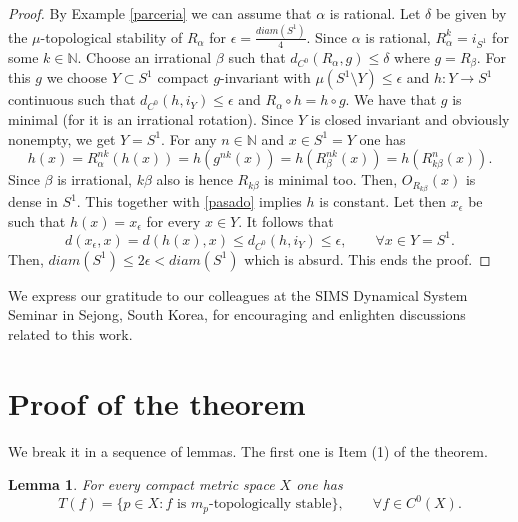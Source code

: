 \documentclass[11pt,letterpaper]{amsart}
\theoremstyle{plain}
\newtheorem{lemma}{Lemma}
\begin{document}
\begin{proof}
By Example \ref{parceria} we can assume that $\alpha$ is rational.
Let $\delta$ be given by the $\mu$-topological stability of $R_\alpha$ for $\epsilon=\frac{diam(S^1)}4$.
Since $\alpha$ is rational, $R^k_\alpha=i_{S^1}$ for some $k\in \mathbb{N}$.
Choose an irrational $\beta$ such that
$d_{C^0}(R_\alpha,g)\leq\delta$ where $g=R_\beta$.
For this $g$ we choose $Y\subset S^1$ compact $g$-invariant with $\mu(S^1\setminus Y)\leq\epsilon$ and $h:Y\to S^1$ continuous such that
$d_{C^0}(h,i_Y)\leq\epsilon$ and $R_\alpha\circ h=h\circ g$.
We have that $g$ is minimal (for it is an irrational rotation).
Since $Y$ is closed invariant and obviously nonempty, we get $Y=S^1$.
For any $n\in\mathbb{N}$ and $x\in S^1=Y$ one has
\begin{equation}
\label{pasado}
h(x)=R^{nk}_\alpha(h(x))=h(g^{nk}(x))=h(R^{nk}_\beta(x))=h(R^n_{k\beta}(x)).
\end{equation}
Since $\beta$ is irrational, $k\beta$ also is hence $R_{k\beta}$ is minimal too.
Then, $O_{R_{k\beta}}(x)$ is dense in $S^1$. This together with \eqref{pasado}
implies $h$ is constant. Let then $x_\epsilon$ be such that $h(x)=x_\epsilon$ for every $x\in Y$.
It follows that
$$
d(x_\epsilon,x)=d(h(x),x)\leq d_{C^0}(h,i_Y)\leq\epsilon,\quad\quad\forall x\in Y=S^1.
$$
Then,
$diam(S^1)\leq 2\epsilon<diam(S^1)$ which is absurd.
This ends the proof.
\end{proof}



We express our gratitude to our colleagues at the SIMS Dynamical System Seminar in Sejong, South Korea, for encouraging and enlighten discussions related to this work.




\section{Proof of the theorem}


\noindent
We break it in a sequence of lemmas. The first one is Item (1) of the theorem.








\begin{lemma}
\label{depp}
For every compact metric space $X$ one has
$$
T(f)=\{p\in X:f\mbox{ is $m_p$-topologically stable}\},
\quad\quad\forall f\in C^0(X).
$$
\end{lemma}
\end{document}
